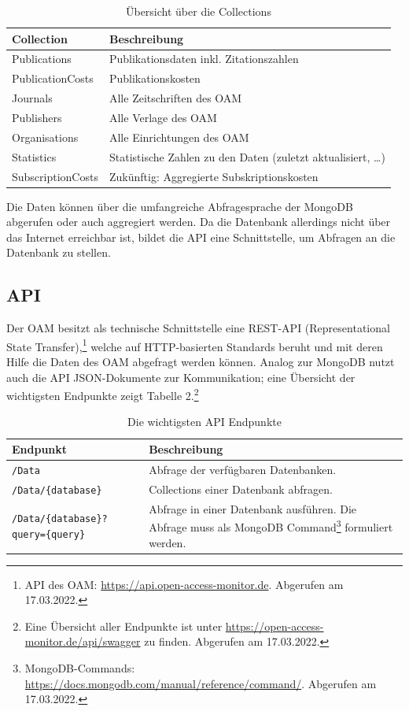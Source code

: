 \documentclass[a4paper,
fontsize=11pt,
oneside,
numbers=noperiodatend,
parskip=half-,
bibliography=totoc,
final
]{scrartcl}
\begin{document}
\begin{table}[!ht]
    \centering
    \begin{tabular}{ll}
    \toprule
        \textbf{Collection} & \textbf{Beschreibung} \\
        \midrule
        Publications & Publikationsdaten inkl. Zitationszahlen \\
        PublicationCosts & Publikationskosten \\
        Journals & Alle Zeitschriften des OAM \\
        Publishers & Alle Verlage des OAM \\
        Organisations & Alle Einrichtungen des OAM \\
        Statistics & Statistische Zahlen zu den Daten (zuletzt aktualisiert, …) \\
        SubscriptionCosts & Zukünftig: Aggregierte Subskriptionskosten \\ 
        \bottomrule
            \end{tabular}
            \caption{Übersicht über die Collections}
\end{table}

Die Daten können über die umfangreiche Abfragesprache der MongoDB
abgerufen oder auch aggregiert werden. Da die Datenbank allerdings nicht
über das Internet erreichbar ist, bildet die API eine Schnittstelle, um
Abfragen an die Datenbank zu stellen.

\hypertarget{api}{%
\subsection{API}\label{api}}

Der OAM besitzt als technische Schnittstelle eine REST-API
(Representational State Transfer),\footnote{API des OAM:
  \url{https://api.open-access-monitor.de}. Abgerufen am 17.03.2022.}
welche auf HTTP-basierten Standards beruht und mit deren Hilfe die Daten
des OAM abgefragt werden können. Analog zur MongoDB nutzt auch die API
JSON-Dokumente zur Kommunikation; eine Übersicht der wichtigsten
Endpunkte zeigt Tabelle 2.\footnote{Eine Übersicht aller Endpunkte ist
  unter \url{https://open-access-monitor.de/api/swagger} zu finden.
  Abgerufen am 17.03.2022.}

\begin{table}[!ht]
    \centering
    \begin{tabular}{lp{9cm}}
    \toprule
        \textbf{Endpunkt} & \textbf{Beschreibung} \\
        \midrule
\texttt{/Data} & Abfrage der verfügbaren Datenbanken. \\
\texttt{/Data/\{database\}} & Collections einer Datenbank abfragen. \\
\texttt{/Data/\{database\}?query=\{query\}} & Abfrage in einer Datenbank
ausführen. Die Abfrage muss als MongoDB Command\footnote{MongoDB-Commands:
  \url{https://docs.mongodb.com/manual/reference/command/}. Abgerufen am
  17.03.2022.} formuliert werden. \\
  \bottomrule
            \end{tabular}
            \caption{Die wichtigsten API Endpunkte}
\end{table}
\end{document}
